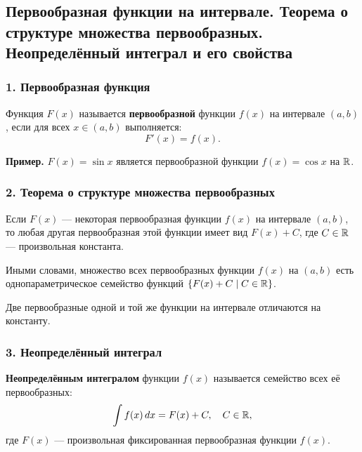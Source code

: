 \subsection{Первообразная функции на интервале. Теорема о структуре множества первообразных. Неопределённый интеграл и его свойства}

\subsubsection*{1. Первообразная функция}

\begin{definition}
Функция $F(x)$ называется \textbf{первообразной} функции $f(x)$ на интервале $(a, b)$, если для всех $x \in (a, b)$ выполняется:
\[ F'(x) = f(x). \]
\end{definition}

\textbf{Пример.} $F(x) = \sin x$ является первообразной функции $f(x) = \cos x$ на $\mathbb{R}$.

\subsubsection*{2. Теорема о структуре множества первообразных}

\begin{theorem}
Если $F(x)$ — некоторая первообразная функции $f(x)$ на интервале $(a, b)$, то любая другая первообразная этой функции имеет вид $F(x) + C$, где $C \in \mathbb{R}$ — произвольная константа.

Иными словами, множество всех первообразных функции $f(x)$ на $(a, b)$ есть однопараметрическое семейство функций $\{F(x) + C \mid C \in \mathbb{R}\}$.
\end{theorem}

\begin{consequence}
Две первообразные одной и той же функции на интервале отличаются на константу.
\end{consequence}

\subsubsection*{3. Неопределённый интеграл}

\begin{definition}
\textbf{Неопределённым интегралом} функции $f(x)$ называется семейство всех её первообразных:
\[ \int f(x)\,dx = F(x) + C, \quad C \in \mathbb{R}, \]
где $F(x)$ — произвольная фиксированная первообразная функции $f(x)$.
\end{definition}

